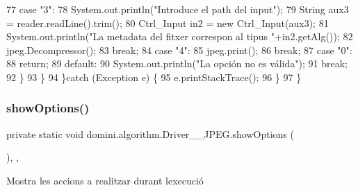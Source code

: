 \begin{DoxyCode}
77                 \textcolor{keywordflow}{case} \textcolor{stringliteral}{"3"}:
78                     System.out.println(\textcolor{stringliteral}{"Introduce el path del input"});
79                     String aux3 = reader.readLine().trim();
80                     Ctrl\_Input in2 = \textcolor{keyword}{new} Ctrl\_Input(aux3);
81                     System.out.println(\textcolor{stringliteral}{"La metadata del fitxer correspon al tipus "}+in2.getAlg());
82                     jpeg.Decompressor();
83                 \textcolor{keywordflow}{break};
84                 \textcolor{keywordflow}{case} \textcolor{stringliteral}{"4"}:
85                     jpeg.print();
86                 \textcolor{keywordflow}{break};
87                 \textcolor{keywordflow}{case} \textcolor{stringliteral}{"0"}:
88                     \textcolor{keywordflow}{return};
89                 \textcolor{keywordflow}{default}:
90                     System.out.println(\textcolor{stringliteral}{"La opción no es válida"});
91                 \textcolor{keywordflow}{break};
92             \}
93         \}
94     \}\textcolor{keywordflow}{catch} (Exception e) \{
95         e.printStackTrace();
96     \}
97     \}
\end{DoxyCode}
\mbox{\label{classdomini_1_1algorithm_1_1Driver____JPEG_a62ce35e061afe893bd03af9bfff41c33}} 
\subsubsection{\texorpdfstring{show\+Options()}{showOptions()}}
{\footnotesize\ttfamily private static void domini.\+algorithm.\+Driver\+\_\+\+\_\+\+J\+P\+E\+G.\+show\+Options (\begin{DoxyParamCaption}{ }\end{DoxyParamCaption})\hspace{0.3cm}{\ttfamily [inline]}, {\ttfamily [static]}, {\ttfamily [private]}}



Mostra les accions a realitzar durant l\textquotesingle{}execució 


